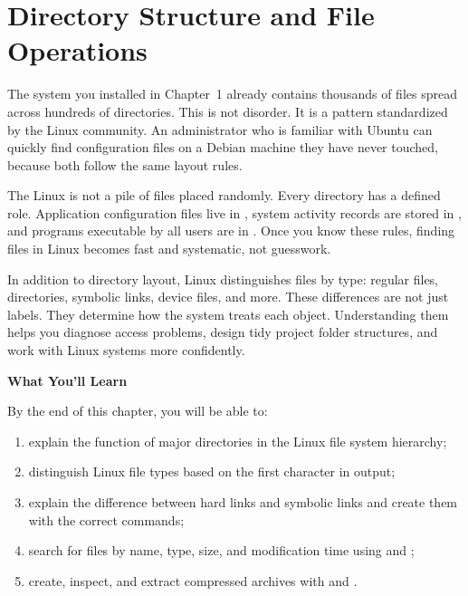 
\chapter{Directory Structure and File Operations}
\label{ch:filesystem-ops}


The system you installed in Chapter~1 already contains thousands of files spread across hundreds of directories. This is not disorder. It is a pattern standardized by the Linux community. An administrator who is familiar with Ubuntu can quickly find configuration files on a Debian machine they have never touched, because both follow the same layout rules.

The Linux  is not a pile of files placed randomly. Every directory has a defined role. Application configuration files live in , system activity records are stored in , and programs executable by all users are in . Once you know these rules, finding files in Linux becomes fast and systematic, not guesswork.

In addition to directory layout, Linux distinguishes files by type: regular files, directories, symbolic links, device files, and more. These differences are not just labels. They determine how the system treats each object. Understanding them helps you diagnose access problems, design tidy project folder structures, and work with Linux systems more confidently.

\textbf{What You'll Learn}

By the end of this chapter, you will be able to:

\begin{enumerate}
    \item explain the function of major directories in the Linux file system hierarchy;
    \item distinguish Linux file types based on the first character in  output;
    \item explain the difference between hard links and symbolic links and create them with the correct commands;
    \item search for files by name, type, size, and modification time using  and ;
    \item create, inspect, and extract compressed archives with  and .
\end{enumerate}

